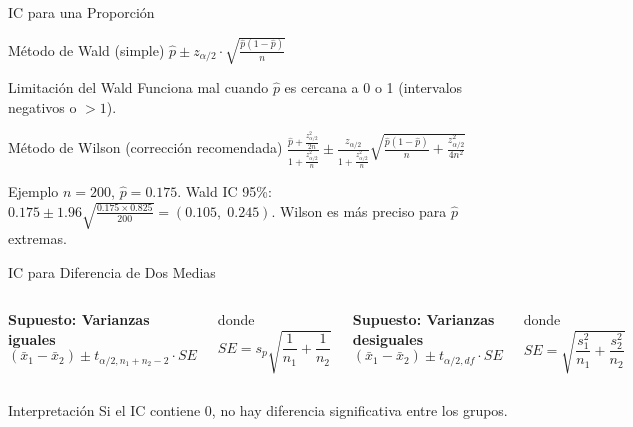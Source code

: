 \documentclass[aspectratio=169,11pt]{beamer}
\begin{document}
\begin{frame}{IC para una Proporción}
\small
\begin{block}{Método de Wald (simple)}
$\hat{p} \pm z_{\alpha/2} \cdot \sqrt{\frac{\hat{p}(1-\hat{p})}{n}}$
\end{block}

\pause

\begin{alertblock}{Limitación del Wald}
Funciona mal cuando $\hat{p}$ es cercana a 0 o 1 (intervalos negativos o $>1$).
\end{alertblock}

\pause

\begin{block}{Método de Wilson (corrección recomendada)}
\scriptsize
$\frac{\hat{p} + \frac{z_{\alpha/2}^2}{2n}}{1 + \frac{z_{\alpha/2}^2}{n}} \pm \frac{z_{\alpha/2}}{1 + \frac{z_{\alpha/2}^2}{n}} \sqrt{\frac{\hat{p}(1-\hat{p})}{n} + \frac{z_{\alpha/2}^2}{4n^2}}$
\end{block}

\pause

\begin{exampleblock}{Ejemplo}
$n = 200$, $\hat{p} = 0.175$. Wald IC 95\%: $0.175 \pm 1.96\sqrt{\frac{0.175 \times 0.825}{200}} = (0.105,\; 0.245)$. Wilson es más preciso para $\hat{p}$ extremas.
\end{exampleblock}
\end{frame}

\begin{frame}{IC para Diferencia de Dos Medias}
\begin{columns}[T]
\textbf{Supuesto: Varianzas iguales}
\begin{equation*}
(\bar{x}_1 - \bar{x}_2) \pm t_{\alpha/2, n_1+n_2-2} \cdot SE
\end{equation*}

donde
\begin{equation*}
SE = s_p \sqrt{\frac{1}{n_1} + \frac{1}{n_2}}
\end{equation*}

\textbf{Supuesto: Varianzas desiguales}
\begin{equation*}
(\bar{x}_1 - \bar{x}_2) \pm t_{\alpha/2, df} \cdot SE
\end{equation*}

donde
\begin{equation*}
SE = \sqrt{\frac{s_1^2}{n_1} + \frac{s_2^2}{n_2}}
\end{equation*}
\end{columns}

\pause

\vspace{0.3cm}

\begin{exampleblock}{Interpretación}
Si el IC contiene 0, no hay diferencia significativa entre los grupos.
\end{exampleblock}
\end{frame}
\end{document}
